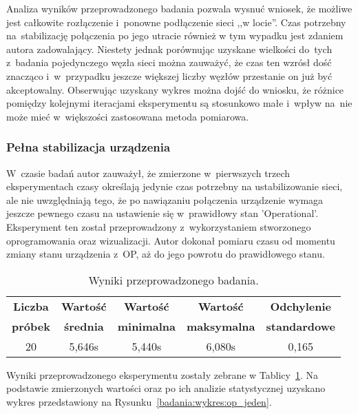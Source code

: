 Analiza wyników przeprowadzonego badania pozwala wysnuć wniosek, że możliwe jest całkowite rozłączenie i~ponowne podłączenie sieci ,,w locie''. Czas potrzebny na~stabilizację połączenia po jego utracie również w tym wypadku jest zdaniem autora zadowalający. Niestety jednak porównując uzyskane wielkości do~tych z~badania pojedynczego węzła sieci można zauważyć, że czas ten wzrósł dość znacząco i~w~przypadku jeszcze większej liczby węzłów przestanie on już być akceptowalny. Obserwując uzyskany wykres można dojść do wniosku, że różnice pomiędzy kolejnymi iteracjami eksperymentu są stosunkowo małe i~wpływ na~nie może mieć w~większości zastosowana metoda pomiarowa.

\vspace{-4mm}
\subsubsection{Pełna stabilizacja urządzenia}
W~czasie badań autor zauważył, że zmierzone w~pierwszych trzech eksperymentach czasy określają jedynie czas potrzebny na ustabilizowanie sieci, ale nie uwzględniają tego, że po nawiązaniu połączenia urządzenie wymaga jeszcze pewnego czasu na ustawienie się w~prawidłowy stan 'Operational'. Eksperyment ten został przeprowadzony z~wykorzystaniem stworzonego oprogramowania oraz wizualizacji. Autor dokonał pomiaru czasu od momentu zmiany stanu urządzenia z~OP, aż do jego powrotu do prawidłowego stanu.

\begin{table}[!htb]
\begin{center}
\begin{tabular}{| c | c | c | c | c |}\hline
\textbf{Liczba} & \textbf{Wartość} & \textbf{Wartość} & \textbf{Wartość} & \textbf{Odchylenie} \\
\textbf{próbek} & \textbf{średnia} & \textbf{minimalna} & \textbf{maksymalna} & \textbf{standardowe} \\\hline\hline
20 & 5,646s & 5,440s & 6,080s & 0,165\\\hline
\end{tabular}
\end{center}
\vspace*{-6mm}
  \caption{Wyniki przeprowadzonego badania.}
	\label{badania:wyniki:op_jeden}
\end{table}

Wyniki przeprowadzonego eksperymentu zostały zebrane w Tablicy~\ref{badania:wyniki:op_jeden}. Na podstawie zmierzonych wartości oraz po ich analizie statystycznej uzyskano wykres przedstawiony na Rysunku~\ref{badania:wykres:op_jeden}.



